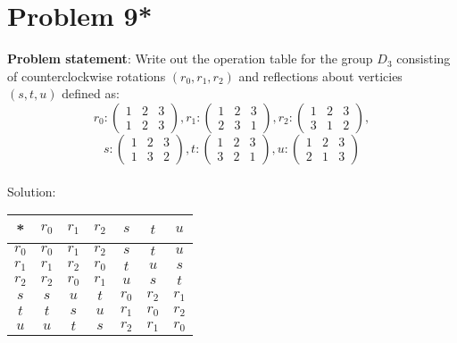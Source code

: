\documentclass{article} %
\begin{document}
\newpage

\section*{Problem 9*}


\textbf{Problem statement}: Write out the operation table for the group $D_3$ consisting of counterclockwise rotations $(r_0, r_1, r_2)$ and reflections about verticies $(s, t, u)$ defined as:
\[r_0:  \left( \begin{matrix} 1 & 2 & 3 \\ 1 & 2 & 3 \end{matrix} \right), 
  r_1:  \left( \begin{matrix} 1 & 2 & 3 \\ 2 & 3 & 1 \end{matrix} \right), 
  r_2:  \left( \begin{matrix} 1 & 2 & 3 \\ 3 & 1 & 2 \end{matrix} \right), \]
\[  s:      \left( \begin{matrix} 1 & 2 & 3 \\ 1 & 3 & 2 \end{matrix} \right), 
  t:       \left( \begin{matrix} 1 & 2 & 3 \\ 3 & 2 & 1 \end{matrix} \right), 
  u:      \left( \begin{matrix} 1 & 2 & 3 \\ 2 & 1 & 3 \end{matrix} \right) \]
\\

Solution: 
\begin{addmargin}[1em]{0em}
\begin{tabular}{c | c c c c c c}
* & $r_0$ & $r_1$ & $r_2$ & $s$ & $t$ & $u$ \\ \hline
$r_0$ & $r_0$ & $r_1$ & $r_2$ & $s$ & $t$ & $u$ \\
$r_1$ & $r_1$ & $r_2$ & $r_0$ & $t$ & $u$ & $s$\\
$r_2$ & $r_2$ & $r_0$ & $r_1$ & $u$ & $s$ & $t$\\
$s$    & $s$ & $u$ & $t$ & $r_0$ & $r_2$ & $r_1$\\
$t$     & $t$ & $s$ & $u$ & $r_1$ & $r_0$ & $r_2$\\
$u$    & $u$ & $t$ & $s$ & $r_2$ & $r_1$ & $r_0$
\end{tabular}
\end{addmargin}
\end{document}
